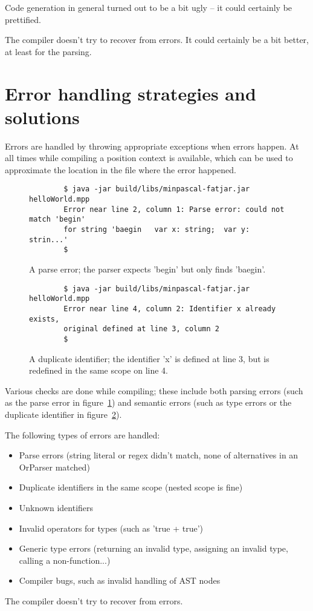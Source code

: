 \documentclass{article}
\begin{document}
Code generation in general turned out to be a bit ugly -- it could certainly
be prettified.

The compiler doesn't try to recover from errors. It could certainly be a bit
better, at least for the parsing.

\section{Error handling strategies and solutions}

Errors are handled by throwing appropriate exceptions when errors happen. At
all times while compiling a position context is available, which can be used
to approximate the location in the file where the error happened. 

\begin{figure}[ht!]
    \begin{verbatim}
        $ java -jar build/libs/minpascal-fatjar.jar helloWorld.mpp
        Error near line 2, column 1: Parse error: could not match 'begin'
        for string 'baegin   var x: string;  var y: strin...'
        $
    \end{verbatim}
    \caption{A parse error; the parser expects 'begin' but only finds 'baegin'.}
    \label{fig:parseerror}
\end{figure}

\begin{figure}[ht!]
    \begin{verbatim}
        $ java -jar build/libs/minpascal-fatjar.jar helloWorld.mpp
        Error near line 4, column 2: Identifier x already exists,
        original defined at line 3, column 2
        $
    \end{verbatim}
    \caption{A duplicate identifier; the identifier 'x' is defined at line 3,
    but is redefined in the same scope on line 4.}
    \label{fig:dupe}
\end{figure}

Various checks are done while compiling; these include both parsing errors (such
as the parse error in figure~\ref{fig:parseerror}) and semantic errors (such as
type errors or the duplicate identifier in figure~\ref{fig:dupe}).

The following types of errors are handled:
\begin{itemize}
    \item Parse errors (string literal or regex didn't match, none of
        alternatives in an OrParser matched)
    \item Duplicate identifiers in the same scope (nested scope is fine)
    \item Unknown identifiers
    \item Invalid operators for types (such as 'true + true')
    \item Generic type errors (returning an invalid type, assigning an invalid
        type, calling a non-function...)
    \item Compiler bugs, such as invalid handling of AST nodes
\end{itemize}

The compiler doesn't try to recover from errors.
\end{document}
